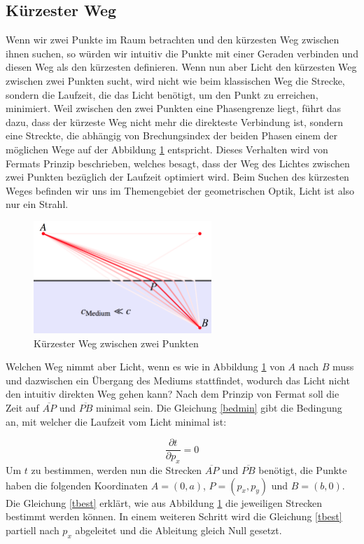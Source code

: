 \begin{refsection}
\section{Kürzester Weg}
Wenn wir zwei Punkte im Raum betrachten und den kürzesten Weg zwischen
ihnen suchen, so würden wir intuitiv die Punkte mit einer Geraden
verbinden und diesen Weg als den kürzesten definieren. Wenn nun aber
Licht den kürzesten Weg zwischen zwei Punkten sucht, wird nicht wie
beim klassischen Weg die Strecke, sondern die Laufzeit, die das Licht
benötigt, um den Punkt zu erreichen, minimiert. Weil zwischen den zwei
Punkten eine Phasengrenze liegt, führt das dazu, dass der kürzeste
Weg nicht mehr die direkteste Verbindung ist, sondern eine Streckte,
die abhängig von Brechungsindex der beiden Phasen einem der möglichen
Wege auf der Abbildung \ref{fig:weg} entspricht. Dieses Verhalten wird
von Fermats Prinzip beschrieben, welches besagt, dass der Weg des Lichtes
zwischen zwei Punkten bezüglich der Laufzeit optimiert wird. Beim Suchen
des kürzesten Weges befinden wir uns im Themengebiet der geometrischen
Optik, Licht ist also nur ein Strahl.

\begin{figure}
  \centering
  \includegraphics[width=0.6\textwidth]{adaptiv/images/Weg}
  \caption{Kürzester Weg zwischen zwei Punkten}
  \label{fig:weg}
\end{figure}
Welchen Weg nimmt aber Licht, wenn es wie in Abbildung \ref{fig:weg} von $A$ nach $B$ muss und dazwischen ein Übergang des Mediums stattfindet, wodurch das Licht nicht den intuitiv direkten Weg gehen kann? Nach dem Prinzip von Fermat soll die Zeit auf $\overline{AP}$ und $\overline{PB}$ minimal sein. Die Gleichung \eqref{bedmin} gibt die Bedingung an, mit welcher die Laufzeit vom Licht minimal ist:

\begin{equation}\label{bedmin}
\dfrac{\partial t}{\partial p_{x}}=0
\end{equation}
Um $t$ zu bestimmen, werden nun die Strecken $\overline{AP}$ und $\overline{PB}$ benötigt, die Punkte haben die folgenden Koordinaten $A = (0,a)$, $P=(p_{x},p_{y})$ und $B=(b,0)$. Die Gleichung \eqref{tbest} erklärt, wie aus Abbildung \ref{fig:weg} die jeweiligen Strecken bestimmt werden können. In einem weiteren Schritt wird die Gleichung \eqref{tbest} partiell nach $p_{x}$ abgeleitet und die Ableitung gleich Null gesetzt.


\end{refsection}
